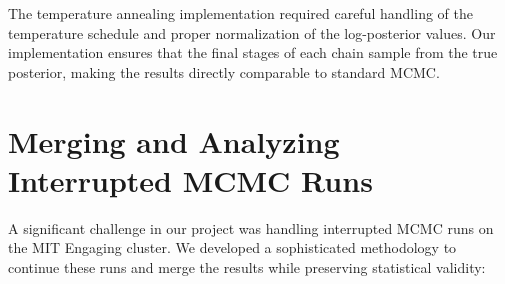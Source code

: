 \documentclass[11pt]{article}
\theoremstyle{definition}
\begin{document}
The temperature annealing implementation required careful handling of the temperature schedule and proper normalization of the log-posterior values. Our implementation ensures that the final stages of each chain sample from the true posterior, making the results directly comparable to standard MCMC.

\renewcommand{\thesection}{D}
\section{Merging and Analyzing Interrupted MCMC Runs}

A significant challenge in our project was handling interrupted MCMC runs on the MIT Engaging cluster. We developed a sophisticated methodology to continue these runs and merge the results while preserving statistical validity:
\end{document}
